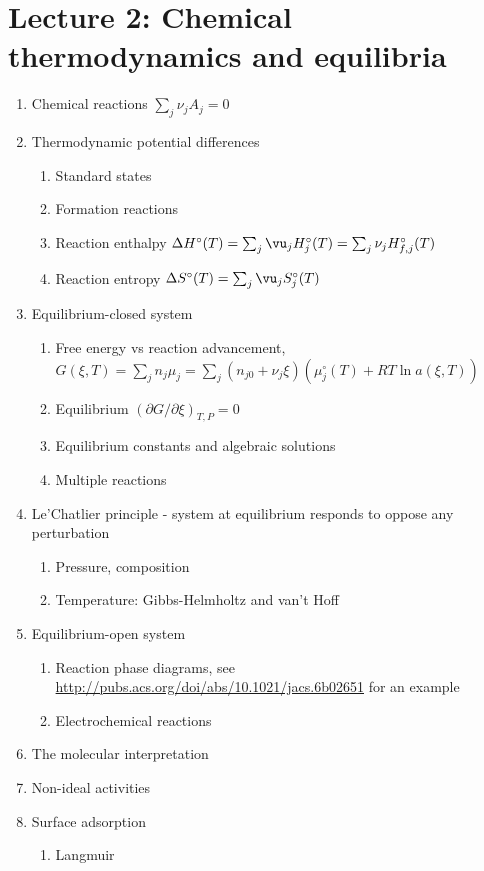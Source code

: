 \documentclass[11pt]{article}
\begin{document}
\section{Lecture 2: Chemical thermodynamics and equilibria}
\label{sec:org096f710}
\begin{enumerate}
\item Chemical reactions \(\sum_j \nu_j A_j = 0\)
\item Thermodynamic potential differences
\begin{enumerate}
\item Standard states
\item Formation reactions
\item Reaction enthalpy \(\Delta H^\circ (T) = \sum_j \vu_j H^\circ_j (T) = \sum_j \nu_j H^\circ_{f,j}(T)\)
\item Reaction entropy \(\Delta S^\circ (T) =  \sum_j \vu_j S^\circ_j (T)\)
\end{enumerate}
\item Equilibrium-closed system
\begin{enumerate}
\item Free energy vs reaction advancement, \(G(\xi,T) = \sum_j n_j\mu_j = \sum_j \left (n_{j0} + \nu_j \xi \right ) \left (\mu_j^\circ(T) + RT \ln a(\xi,T) \right )\)
\item Equilibrium \((\partial G / \partial \xi)_{T,P} = 0\)
\item Equilibrium constants and algebraic solutions
\item Multiple reactions
\end{enumerate}
\item Le'Chatlier principle - system at equilibrium responds to oppose any perturbation
\begin{enumerate}
\item Pressure, composition
\item Temperature: Gibbs-Helmholtz and van't Hoff
\end{enumerate}
\item Equilibrium-open system
\begin{enumerate}
\item Reaction phase diagrams, see \url{http://pubs.acs.org/doi/abs/10.1021/jacs.6b02651} for an example
\item Electrochemical reactions
\end{enumerate}
\item The molecular interpretation
\item Non-ideal activities
\item Surface adsorption
\begin{enumerate}
\item Langmuir
\end{enumerate}
\end{enumerate}
\end{document}
